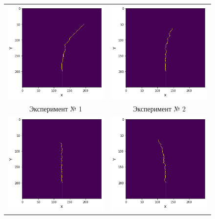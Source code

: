 
\begin{figure}
	\begin{tabular}{cc}
		\includegraphics[width=0.45 \textwidth]{images/part2/crack_1.png} & \includegraphics[width=0.45 \textwidth]{images/part2/crack_2.png} \\
		Эксперимент № 1 & Эксперимент № 2 \\[6pt]
		\includegraphics[width=0.45 \textwidth]{images/part2/crack_3.png} &   \includegraphics[width=0.45 \textwidth]{images/part2/crack_4.png} \\

\end{tabular}
\end{figure}
